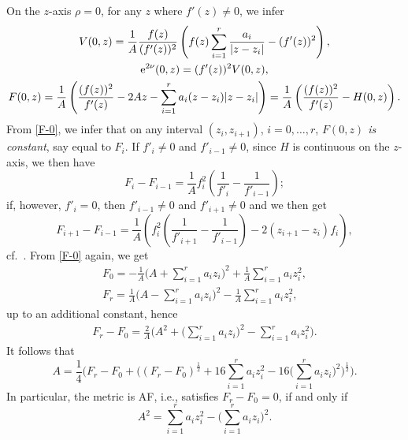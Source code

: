 \documentclass[10pt,a4paper]{amsart}
\numberwithin{equation}{section}
\begin{document}
On the $z$-axis $\rho = 0$, for any $z$ where $f'(z) \neq 0$, we infer
\begin{gather} V (0, z) = \frac{1}{A} \frac{f (z)}{(f' (z))^2} \left(f (z) \sum _{i = 1}^r \frac{a_i}{|z - z _i|} - (f' (z))^2\right),\label{V-0}\\
{\rm e}^{2 \nu} (0, z) = (f' (z)) ^2 V(0, z), \nonumber\\ %
F (0, z) = \frac{1}{A} \left(\frac{(f (z))^2}{f' (z)} - 2 A z - \sum _{i = 1}^r a _i (z - z_i) |z - z _i|\right) = \frac{1}{A} \left(\frac{(f (z))^2}{f' (z)} - H (0, z)\right). \label{F-0}
 \end{gather}
From \eqref{F-0}, we infer that on any interval $(z_i, z_{i + 1})$, $i = 0, \dots, r$, {\it $F (0, z)$ is constant}, say equal to $F _i$. If $f' _i \neq 0$ and $f' _{i - 1} \neq 0$, since $H$ is continuous on the $z$-axis, we then have
\[%
 F_i - F_{i - 1} = \frac{1}{A} f_i ^2 \left(\frac{1}{f'_i} - \frac{1}{f'_{i - 1}}\right); \]
if, however, $f'_i = 0$, then $f'_{i - 1} \neq 0$ and $f'_{i + 1} \neq 0$ and we then get
\[
F_{i + 1} - F_{i - 1} = \frac{1}{A} \left(f_i ^2 \left(\frac{1}{f'_{i + 1}} - \frac{1}{f'_{i - 1}}\right) - 2 (z _{i + 1} - z _i) f_i\right), \]
cf.\ \cite[Propsition 7]{BG}.
From \eqref{F-0} again, we get
\begin{gather*}F _0 = - \frac{1}{A} \bigg(A + \sum _{i = 1} ^r a _i z _i\bigg) ^2 + \frac{1}{A } \sum _{i = 1} ^r a _i z _i ^2, \\
F _r = \frac{1}{A} \bigg(A - \sum _{i = 1} ^r a _i z _i\bigg) ^2 - \frac{1}{A } \sum _{i = 1} ^r a _i z _i ^2, \end{gather*}
up to an additional constant, hence
\begin{gather} \label{Fr-F0} F_r - F_0 = \frac{2}{A} \bigg(A ^ 2 + \bigg(\sum _{i = 1} ^r a _i z _i\bigg) ^2 - \sum _{i = 1} ^r a_i z _i ^2\bigg). \end{gather}
It follows that
\[ A = \frac{1}{4} \bigg(F_r - F_0 + \bigg((F_r - F_0) ^{\frac{1}{2}} + 16 \sum _{i = 1} ^r a _i z _i ^2 - 16 \bigg(\sum _{i = 1} ^r a _i z _i\bigg) ^2\bigg) ^{\frac{1}{2}}\bigg). \]
In particular, the metric is AF, i.e., satisfies $F_r - F _0 = 0$, if and only if
\[
 A ^2 = \sum _{i = 1}^r a _i z _i ^2 - \bigg(\sum _{i = 1} ^r a _i z _i\bigg) ^2. \]
\end{document}

